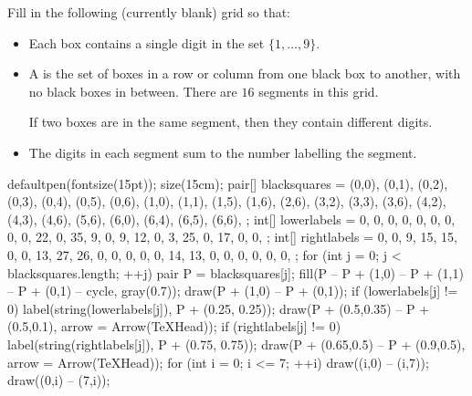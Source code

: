 Fill in the following (currently blank) grid so that:
	\begin{itemize}
		\item Each box contains a single digit in the set $\{1,\dots,9\}$.
		\item A  is the set of boxes in a row or column from one black box to another, with no black boxes in between. There are $16$ segments in this grid.
		
		If two boxes are in the same segment, then they contain different digits.
		\item The digits in each segment sum to the number labelling the segment.
	\end{itemize}
	\begin{center}
		\begin{asy}
			defaultpen(fontsize(15pt));
			size(15cm);
			pair[] blacksquares = {
				(0,0), (0,1), (0,2), (0,3), (0,4), (0,5), (0,6),
				(1,0), (1,1), (1,5), (1,6),
				(2,6),
				(3,2), (3,3), (3,6),
				(4,2), (4,3), (4,6),
				(5,6),
				(6,0), (6,4), (6,5), (6,6),
			};
			int[] lowerlabels = {
				0, 0, 0, 0, 0, 0, 0,
				0, 0, 22, 0,
				35,
				9, 0, 9,
				12, 0, 3,
				25,
				0, 17, 0, 0,
			};
			int[] rightlabels = {
				0, 0, 9, 15, 15, 0, 0,
				13, 27, 26, 0,
				0,
				0, 0, 0,
				14, 13, 0,
				0,
				0, 0, 0, 0,
			};
			for (int j = 0; j < blacksquares.length; ++j) {
				pair P = blacksquares[j];
				fill(P -- P + (1,0) -- P + (1,1) -- P + (0,1) -- cycle, gray(0.7));
				draw(P + (1,0) -- P + (0,1));
				if (lowerlabels[j] != 0) {
					label(string(lowerlabels[j]), P + (0.25, 0.25));
					draw(P + (0.5,0.35) -- P + (0.5,0.1), arrow = Arrow(TeXHead));
				}
				if (rightlabels[j] != 0) {
					label(string(rightlabels[j]), P + (0.75, 0.75));
					draw(P + (0.65,0.5) -- P + (0.9,0.5), arrow = Arrow(TeXHead));
				}
			}
			for (int i = 0; i <= 7; ++i) {
				draw((i,0) -- (i,7));
				draw((0,i) -- (7,i));
			}
		\end{asy}
	\end{center}
	